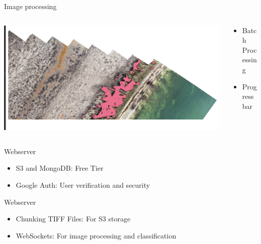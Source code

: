 \begin{frame}{Image processing}
    \begin{columns}
        \begin{column}{0.8\textwidth}
            \includegraphics[height=0.7\textheight,keepaspectratio]{images/mm_classified.png}
        \end{column}
        \begin{column}{0.2\textwidth}
            \begin{itemize}
                \item Batch Processing
                \item Progressbar
            \end{itemize}
        \end{column}
    \end{columns}
\end{frame}

\begin{frame}{Webserver}
    \begin{itemize}
        \item S3 and MongoDB: Free Tier
        \item Google Auth: User verification and security
    \end{itemize}    
\end{frame}

\begin{frame}{Webserver}
    \begin{itemize}
        \item Chunking TIFF Files: For S3 storage
        \item WebSockets: For image processing and classification
    \end{itemize}    
\end{frame}

